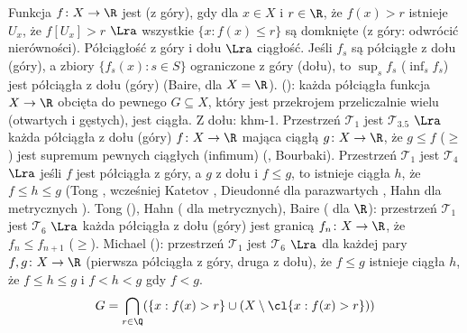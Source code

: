 Funkcja  $f \colon X \to \R$ jest  (z góry), gdy dla $x \in X$ i $r \in \R$, że $f(x) > r$ istnieje $U_x$, że $f[U_x] > r$ $\Lra$ wszystkie $\{x : f(x) \le r\}$ są domknięte (z góry: odwrócić nierówności).
Półciągłość z góry i dołu $\Lra$ ciągłość.
Jeśli $f_s$ są półciągłe z dołu (góry), a zbiory $\{f_s(x) : s \in S\}$ ograniczone z góry (dołu), to $\sup_s f_s$ ($\inf_s f_s$) jest półciągła z dołu (góry) (Baire,  dla $X = \R$).
 (): każda półciągła funkcja $X \to \R$ obcięta do pewnego $G \subseteq X$, który jest  przekrojem przeliczalnie wielu (otwartych i gęstych), jest ciągła.
Z dołu: khm-1.
Przestrzeń $\mathcal T_1$ jest $\mathcal T_{3.5}$ $\Lra$ każda półciągła z dołu (góry) $f \colon X \to \R$ mająca ciągłą $g \colon X \to \R$, że $g \le f$ ($\ge$) jest supremum pewnych ciągłych (infimum) (, Bourbaki).
Przestrzeń $\mathcal T_1$ jest $\mathcal T_4$ $\Lra$ jeśli $f$ jest półciągła z góry, a $g$ z dołu i $f \le g$, to istnieje ciągła $h$, że $f \le h \le g$ (Tong , wcześniej Katetov , Dieudonné dla parazwartych , Hahn dla metrycznych ).
Tong (), Hahn ( dla metrycznych), Baire ( dla $\R$): przestrzeń $\mathcal T_1$ jest $\mathcal T_6$ $\Lra$ każda półciągła z dołu (góry) jest granicą $f_n \colon X \to \R$, że $f_n \le f_{n+1}$ ($\ge$).
Michael (): przestrzeń $\mathcal T_1$ jest $\mathcal T_6$ $\Lra$ dla każdej pary $f, g \colon X \to \R$ (pierwsza półciągła z góry, druga z dołu), że $f \le g$ istnieje ciągła $h$, że $f \le h \le g$ i $f < h < g$ gdy $f < g$.
\[
	G = \bigcap_{r \in \Q} (\{x : f(x) > r\} \cup (X \setminus \cl \{x : f(x) > r\})) 
\]